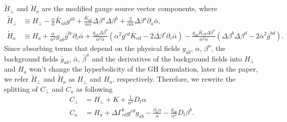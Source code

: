 \documentclass[letterpaper,nofootinbib,prd,amsmath,onecolumn]{revtex4-1}
\begin{document}
${\tilde H}_{\perp}$ and ${\tilde H}_{a}$ are the modified gauge source vector components, where
\begin{subequations}
\begin{align}
{\tilde H}_{\perp} & \equiv H_{\perp} - \frac{\alpha}{{\bar \alpha}}{\bar K}_{ab}g^{ab} + \frac{{\bar K}_{ab}}{\alpha{\bar \alpha}}\Delta \beta^{a} \Delta \beta^{b} + \frac{2}{\alpha {\bar \alpha}}\Delta \beta^{a} \partial_{a}{\bar \alpha}, \\
{\tilde H}_{a} & \equiv H_{a} + \frac{{\bar \alpha}}{\alpha^2}g_{ab}{\bar g}^{bc}\partial_{c}{\bar \alpha} + \frac{g_{ab}\Delta \beta^{b}}{\alpha^2 {\bar \alpha}}(\alpha^2g^{cd}{\bar K}_{cd} - 2\Delta\beta^{c}\partial_{c}{\bar \alpha}) - \frac{g_{ab}{\bar K}_{cd}\Delta \beta^{c}}{\alpha^2{\bar \alpha}}(\Delta \beta^{b}\Delta \beta^{d} - 2{\bar \alpha}^2{\bar g}^{bd}).
\end{align}
\end{subequations}
Since absorbing terms that depend on the physical fields $g_{ab}$, $\alpha$, $\beta^{a}$, the background fields ${\bar g}_{ab}$, ${\bar \alpha}$, ${\bar \beta}^{a}$ and the derivatives of the background fields into $H_{\perp}$ and $H_{a}$ won't change the hyperbolicity of the GH formulation, later in the paper, we refer ${\tilde H}_{\perp}$ and ${\tilde H}_{a}$ as $H_{\perp}$ and $H_{a}$, respectively. Therefore, we rewrite the splitting of $C_{\perp}$ and $C_{a}$ as following
\begin{subequations}
\begin{align}
C_{\perp} & = H_{\perp} + K + \frac{1}{\alpha^{2}}D_{t}\alpha\\
C_{a} & = H_{a} + \Delta \Gamma^{b}_{cd}g^{cd}g_{ab} - \frac{\partial_{a}\alpha}{\alpha} - \frac{g_{ab}}{\alpha^2}D_{t}\beta^{b}.
\end{align}
\end{subequations}
\end{document}
